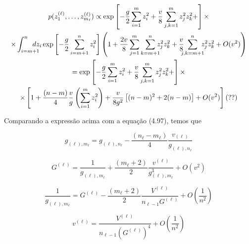 \documentclass{beamer}
\def\eell{{(\ell)}}
\begin{document}
\begin{frame}
	\small
	\begin{multline*}
		p(z_1^\eell, \ldots, z_{m_\ell}^\eell ) \propto \exp\left[-\frac{g}{2}\sum_{i=1}^{m}  z_i^2  + \frac{v}{8}\sum_{j,k=1}^{m}  z_j^2z_k^2 + \right]\times\\
		\times \int_{i=m+1}^{n}\hspace{-12pt} dz_i \exp\left[ -\frac{g}{2}\sum_{i=m+1}^{n}  z_i^2 \right] 
		\left(1 + \frac{2v}{8}\sum_{j=1}^{m}\sum_{k=m+1}^{n} \hspace*{-6pt}z_j^2z_k^2 +  \frac{v}{8}\hspace{-6pt}\sum_{j,k=m+1}^{n} \hspace{-6pt} z_j^2 z_k^2   + O(v^2)\right)\\
		= \exp\left[-\frac{g}{2}\sum_{i=1}^{m}  z_i^2  + \frac{v}{8}\sum_{j,k=1}^{m}  z_j^2z_k^2 + \right]\times \\
		\times\left[1+ \frac{(n -m)}{4}\frac{v}{g}\left(\sum_{i=1}^m z_i^2\right) + \frac{v}{8g^2}\left[(n-m)^2 + 2(n-m)\right] + O(v^2)\right] (??)
	\end{multline*}
\end{frame}

\begin{frame}
	Comparando a expressão acima com a equação (4.97), temos que

	\begin{equation*}\tag{4.100}
		g_{\eell,m_\ell} = g_{\eell,n_\ell} - \frac{(n_\ell -m_\ell)}{4}\frac{v_{\eell}}{g_{\eell,n_\ell}}
	\end{equation*}  
\end{frame}


\begin{frame}
	\begin{equation*}\tag{4.101}
		G^\eell = \frac{1}{g_{\eell,m_\ell}} + \frac{(m_\ell+2)}{2}\frac{v^\eell}{g^3_{\eell,m_\ell}} + O\left(v^2\right)
	\end{equation*}

	\begin{equation*}\tag{4.102}
		\frac{1}{g_{\eell,m_\ell}} = G^\eell - \frac{(m_\ell+2)}{2}\frac{V^\eell}{n_{\ell-1}G ^\eell} + O\left(\frac{1}{n^2}\right)
	\end{equation*}

	\begin{equation*}
		v^\eell = \frac{V^\eell}{n_{\ell-1}(G^\eell)^4 } + O\left(\frac{1}{n^2}\right)  
	\end{equation*}
\end{frame}
\end{document}
